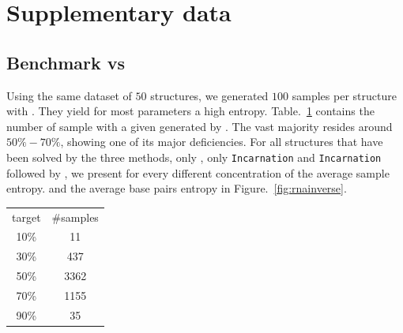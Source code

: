 \section{Supplementary data}
\subsection{Benchmark \ourprog vs \RNAinverse}
Using the same dataset of $50$ structures, we generated $100$ samples
per structure with \RNAinverse. They yield for most parameters
a high entropy.
Table.~\ref{tab:nb_rnainv} contains the number of sample with a given \GCContent generated by \RNAinverse. The vast majority resides around $50\%-70\%$, showing one of its major deficiencies. 
 For all structures that have been solved 
by the three methods, only \RNAinverse, only \texttt{Incarnation} and
\texttt{Incarnation} followed by \RNAinverse, 
we present for every different concentration of \GCContent
the average sample entropy. and the average base pairs entropy in Figure.~\ref{fig:rnainverse}.

\begin{table}[h!]
	\begin{center}
		\begin{tabular}{|c|c|}
		\hline
		target \GCContent & $\#$\RNAinverse samples\\
		10\% & 11\\
			30\%& 437\\
		50\%& 3362\\
	70\% &1155\\
	90\%& 35\\\hline
		\end{tabular}
	\end{center}
	\label{tab:nb_rnainv}
\end{table}


